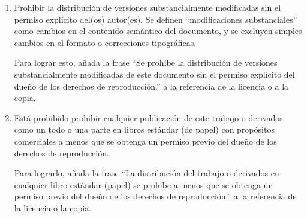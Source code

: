 \begin{enumerate}[A]
\item Prohibir la distribución de versiones substancialmente
  modificadas sin el permiso explícito del(os) autor(es).  Se definen
  ``modificaciones substanciales'' como cambios en el contenido
  semántico del documento, y se excluyen simples cambios en el formato
  o correcciones tipográficas.

  Para lograr esto, añada la frase ``Se prohibe la distribución de
  versiones substancialmente modificadas de este documento sin el
  permiso explícito del dueño de los derechos de reproducción.'' a la
  referencia de la licencia o a la copia.

\item Está prohibido prohibir cualquier publicación de este trabajo o
  derivados como un todo o una parte en libros estándar (de papel) con
  propósitos comerciales a menos que se obtenga un permiso previo del
  dueño de los derechos de reproducción.

  Para lograrlo, añada la frase ``La distribución del trabajo o
  derivados en cualquier libro estándar (papel) se prohibe a menos que
  se obtenga un permiso previo del dueño de los derechos de
  reproducción.'' a la referencia de la licencia o la copia.
\end{enumerate}

